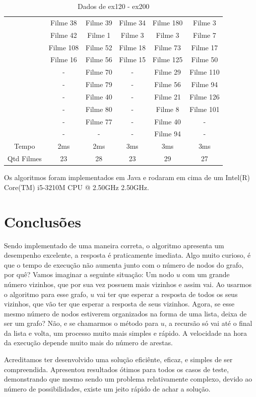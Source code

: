 \documentclass[12pt]{article}
\begin{document}
\begin{table}[H]
\begin{tabular}{|c|c|c|c|c|c|}
\cline{2-6}
& Filme 38 & Filme 39 & Filme 34 & Filme 180 & Filme 3 \\
\cline{2-6}
& Filme 42 & Filme 1 & Filme 3 & Filme 3 & Filme 7 \\
\cline{2-6}
& Filme 108 & Filme 52 & Filme 18 & Filme 73 & Filme 17 \\
\cline{2-6}
& Filme 16 & Filme 56 & Filme 15 & Filme 125 & Filme 50 \\
\cline{2-6}
& - & Filme 70 & - & Filme 29 & Filme 110 \\
\cline{2-6}
& - & Filme 79 & - & Filme 56 & Filme 94 \\
\cline{2-6}
& - & Filme 40 & - & Filme 21 & Filme 126 \\
\cline{2-6}
& - & Filme 80 & - & Filme 8 & Filme 101 \\
\cline{2-6}
& - & Filme 77 & - & Filme 40 & - \\
\cline{2-6}
& - & - & - & Filme 94 & - \\
\hline
Tempo & 2ms & 2ms & 3ms & 3ms & 3ms \\
\hline
Qtd Filmes & 23 & 28 & 23 & 29 & 27\\
\hline

\end{tabular}
\label{Tabela2}
\caption{Dados de ex120 - ex200}

\end{table}

Os algoritmos foram implementados em Java e rodaram em cima de um Intel(R)
Core(TM) i5-3210M CPU @ 2.50GHz 2.50GHz.

\section{Conclusões}

Sendo implementado de uma maneira correta, o algoritmo apresenta um desempenho
excelente, a resposta é praticamente imediata. Algo muito curioso, é que o tempo
de execução não aumenta junto com o número de nodos do grafo, por quê? Vamos
imaginar a seguinte situação: Um nodo $u$ com um grande número vizinhos, que por
sua vez possuem mais vizinhos e assim vai. Ao usarmos o algoritmo para esse
grafo, $u$ vai ter que esperar a resposta de todos os seus vizinhos, que vão ter
que esperar a resposta de seus vizinhos. Agora, se esse mesmo número de nodos
estiverem organizados na forma de uma lista, deixa de ser um grafo? Não, e se
chamarmos o método para $u$, a recursão só vai até o final da lista e volta, um
processo muito mais simples e rápido. A velocidade na hora da execução depende
muito mais do número de arestas.

Acreditamos ter desenvolvido uma solução eficiênte, eficaz, e simples de ser
compreendida. Apresentou resultados ótimos para todos os casos de teste,
demonstrando que mesmo sendo um problema relativamente complexo, devido ao
número de possibilidades, existe um jeito rápido de achar a solução.
\end{document}
